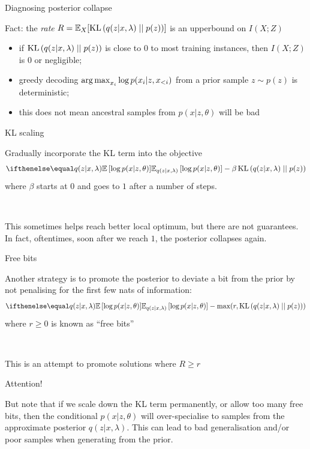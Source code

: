 \begin{frame}{Diagnosing posterior collapse}

Fact: the \emph{rate} $R = \mathbb E_X[\operatorname{KL}\left(q(z|x, \lambda)\mid\mid p(z)\right)]$ is an upperbound on $I(X; Z)$  \pause

\begin{itemize}
	\item if $\operatorname{KL}\left(q(z|x, \lambda)\mid\mid p(z)\right)$ is close to $0$ to most training instances, then $I(X; Z)$ is $0$ or negligible; \pause
	\item greedy decoding $\operatorname*{arg\,max}_{x_i} \log p(x_i|z, x_{<i})$ from a prior sample $z \sim p(z)$ is deterministic; \pause
	\item this does not mean ancestral samples from $p(x|z, \theta)$ will be bad
\end{itemize}


\end{frame}

\begin{frame}{KL scaling}


Gradually incorporate the KL term into the objective
\begin{equation*}
\E[q(z|x,\lambda)]{\log p(x|z,\theta)} - \beta \KL{q(z|x,\lambda)}{p(z)}
\end{equation*}
where $\beta$ starts at $0$ and goes to $1$ after a number of steps.

~ \pause

This sometimes helps reach better local optimum, but there are not guarantees. In fact, oftentimes, soon after we reach $1$, the posterior collapses again.
\end{frame}

\begin{frame}{Free bits}

Another strategy is to promote the posterior to deviate a bit from the prior by not penalising for the first few nats of information:
\begin{equation*}
\E[q(z|x,\lambda)]{\log p(x|z,\theta)} - \max(r, \KL{q(z|x,\lambda)}{p(z)})
\end{equation*}
where $r \ge 0$ is known as ``free bits''  

~

This is an attempt to promote solutions where $R \ge r$

\end{frame}

\begin{frame}{Attention!}

But note that if we scale down the KL term permanently, or allow too many free bits, then the conditional $p(x|z, \theta)$ will over-specialise to samples from the approximate posterior $q(z|x, \lambda)$. 
This can lead to bad generalisation and/or poor samples when generating from the prior.

\end{frame}

